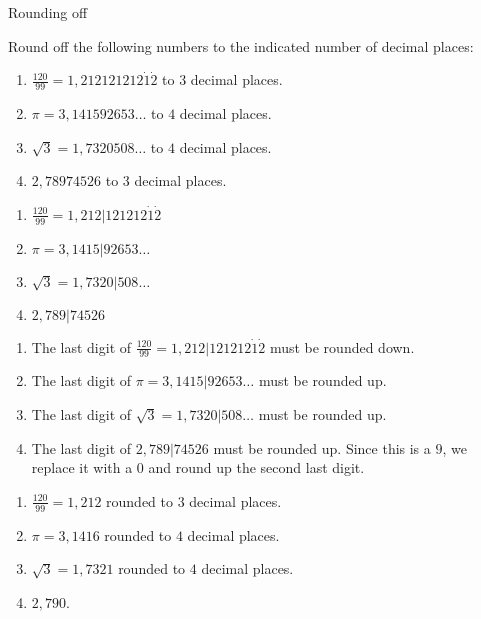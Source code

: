 \begin{wex}{Rounding off }

{Round off the following numbers to the indicated number of decimal places: 
\begin{enumerate}[itemsep=5pt, label=\textbf{\arabic*}. ] 

\item $\frac{120}{99}=1,212121212\dot{1}\dot{2}$ to $3$ decimal places.
\item $\pi =3,141592653\ldots$ to $4$ decimal places.
\item $\sqrt{3}=1,7320508\ldots$ to $4$ decimal places.
\item $2,78974526$ to $3$ decimal places.
\end{enumerate}
}
{


\begin{enumerate}[itemsep=5pt, label=\textbf{\arabic*}. ] 
\item $\frac{120}{99}=1,212|121212\dot{1}\dot{2}$
\item $\pi =3,1415|92653\ldots$
\item $\sqrt{3}=1,7320|508\ldots$
\item $2,789|74526$
\end{enumerate}

\begin{enumerate}[itemsep=5pt, label=\textbf{\arabic*}. ]
\item The last digit of $\frac{120}{99}=1,212|121212\dot{1}\dot{2}$  must be rounded down.
\item The last digit of $\pi =3,1415|92653\ldots$ must be rounded up.
\item The last digit of $\sqrt{3}=1,7320|508\ldots$ must be rounded up.
\item  The last digit of $2,789|74526$ must be rounded up.
\newline Since this is a $9$, we replace it with a $0$ and round up the second last digit.
\end{enumerate}

\begin{enumerate}[itemsep=5pt, label=\textbf{\arabic*}. ]
\item $\frac{120}{99}=1,212$ rounded to $3$ decimal places.
\item $\pi =3,1416$  rounded to $4$ decimal places.
\item $\sqrt{3}=1,7321$ rounded to $4$ decimal places.
\item $2,790$.
\end{enumerate}
}  
\end{wex}



